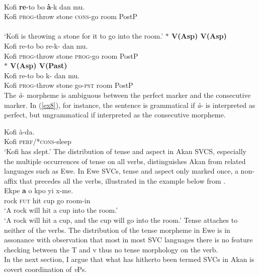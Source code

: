 \documentclass[output=paper,
modfonts
]{langscibook}
\begin{document}
\ea\label{ex4} 
 \\
\gll Kofi \textbf{re}-to bo \textbf{\`a}-k dan mu.\\
	Kofi \textsc{prog}-throw stone \textsc{cons}-go room  PostP\\
	 \\
\glt `Kofi is throwing a stone for it to go into the room.'
\z 
\ex\label{ex05}
\textbf{$\ast$ \phantom {} {} {}  V(Asp)\phantom {} {} {}   V(Asp)} 
     \ea\label{ex07} 
 \\
\gll * Kofi re-to bo re-k- dan mu.\\
	{} Kofi \textsc{prog}-throw  stone  \textsc{prog}-go room PostP\\
\z 
\ex\label{ex005}
\textbf{$\ast$ \phantom {} {} {}  V(Asp)\phantom {} {} {}   V(Past)} 
     \ea\label{ex7} 
 \\
\gll * Kofi re-to bo k- dan mu.\\
	{} Kofi \textsc{prog}-throw  stone  go-\textsc{pst} room PostP\\
\z 
\z \z 
The \emph{\`a}- morpheme is ambiguous between the perfect marker and the consecutive marker. In (\ref{ex8}), for instance, the sentence is grammatical if \emph{\`a}- is interpreted as perfect, but ungrammatical if interpreted as the consecutive morpheme.

\ea \label{ex8}
 \gll Kofi \`a-da.\\
	Kofi \textsc{perf}/*\textsc{cons}-sleep\\
	\glt `Kofi has slept.'
\z The distribution of tense and aspect in Akan SVCS, especially the multiple occurrences of tense on all verbs, distinguishes Akan from related languages such as Ewe. In Ewe SVCs, tense and aspect only marked once, a non-affix that precedes all the verbs, illustrated in the example below from \cite{Collins1997}.
\ea \label{ex0)} 
 \\
\gll Ekpe \textbf{a} \texthtbardotlessj o kpo yi x-me.\\
rock \textsc{fut} hit cup go room-in\\
\glt `A rock will hit a cup into the room.'\\
`A rock will hit a cup, and the cup will go into the room.' 
\z Tense attaches to neither of the verbs. The distribution of the tense morpheme in Ewe is in assonance with  observation that most in most SVC languages there is no feature checking between the T and v thus no tense morphology on the verb.\\
In the next section, I argue that what has hitherto been termed SVCs in Akan is covert coordination of \emph{v}Ps.
\end{document}
